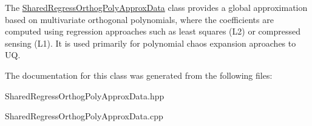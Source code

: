 The \hyperlink{classPecos_1_1SharedRegressOrthogPolyApproxData}{Shared\+Regress\+Orthog\+Poly\+Approx\+Data} class provides a global approximation based on multivariate orthogonal polynomials, where the coefficients are computed using regression approaches such as least squares (L2) or compressed sensing (L1). It is used primarily for polynomial chaos expansion aproaches to UQ. 

The documentation for this class was generated from the following files\+:\begin{DoxyCompactItemize}
\item 
Shared\+Regress\+Orthog\+Poly\+Approx\+Data.\+hpp\item 
Shared\+Regress\+Orthog\+Poly\+Approx\+Data.\+cpp\end{DoxyCompactItemize}

